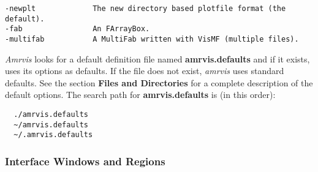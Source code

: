 \begin{verbatim}
-newplt             The new directory based plotfile format (the default).
-fab                An FArrayBox.
-multifab           A MultiFab written with VisMF (multiple files).
\end{verbatim}

{\em Amrvis} looks for a default definition file named  {\bf amrvis.defaults}
and if it exists, uses its options as defaults.
If the file does not exist, {\em amrvis} uses standard defaults.
See the section {\bf Files and Directories} for a complete description
of the default options.
The search path for {\bf amrvis.defaults} is (in this order):

\begin{verbatim}
  ./amrvis.defaults
  ~/amrvis.defaults
  ~/.amrvis.defaults
\end{verbatim}



\subsubsection{Interface Windows and Regions}

